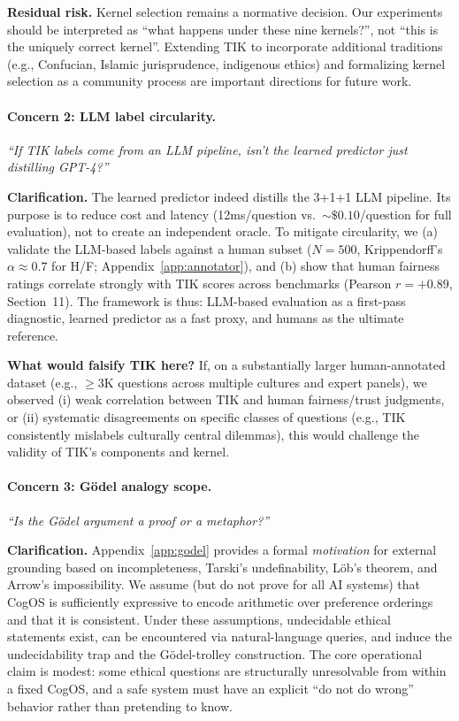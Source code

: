 \documentclass[11pt]{article}
\begin{document}
\textbf{Residual risk.} Kernel selection remains a normative decision. Our experiments should be interpreted as “what happens under these nine kernels?”, not “this is the uniquely correct kernel”. Extending TIK to incorporate additional traditions (e.g., Confucian, Islamic jurisprudence, indigenous ethics) and formalizing kernel selection as a community process are important directions for future work.

\paragraph{Concern 2: LLM label circularity.}
\emph{“If TIK labels come from an LLM pipeline, isn't the learned predictor just distilling GPT-4?”}

\textbf{Clarification.} The learned predictor indeed distills the 3+1+1 LLM pipeline. Its purpose is to reduce cost and latency (12ms/question vs.\ $\sim\$0.10$/question for full evaluation), not to create an independent oracle. To mitigate circularity, we (a) validate the LLM-based labels against a human subset ($N=500$, Krippendorff's $\alpha \approx 0.7$ for H/F; Appendix~\ref{app:annotator}), and (b) show that human fairness ratings correlate strongly with TIK scores across benchmarks (Pearson $r=+0.89$, Section~11). The framework is thus: LLM-based evaluation as a first-pass diagnostic, learned predictor as a fast proxy, and humans as the ultimate reference.

\textbf{What would falsify TIK here?} If, on a substantially larger human-annotated dataset (e.g., $\ge 3$K questions across multiple cultures and expert panels), we observed (i) weak correlation between TIK and human fairness/trust judgments, or (ii) systematic disagreements on specific classes of questions (e.g., TIK consistently mislabels culturally central dilemmas), this would challenge the validity of TIK's components and kernel.

\paragraph{Concern 3: Gödel analogy scope.}
\emph{“Is the Gödel argument a proof or a metaphor?”}

\textbf{Clarification.} Appendix~\ref{app:godel} provides a formal \emph{motivation} for external grounding based on incompleteness, Tarski's undefinability, L\"ob's theorem, and Arrow's impossibility. We assume (but do not prove for all AI systems) that CogOS is sufficiently expressive to encode arithmetic over preference orderings and that it is consistent. Under these assumptions, undecidable ethical statements exist, can be encountered via natural-language queries, and induce the undecidability trap and the Gödel-trolley construction. The core operational claim is modest: some ethical questions are structurally unresolvable from within a fixed CogOS, and a safe system must have an explicit “do not do wrong” behavior rather than pretending to know.
\end{document}

